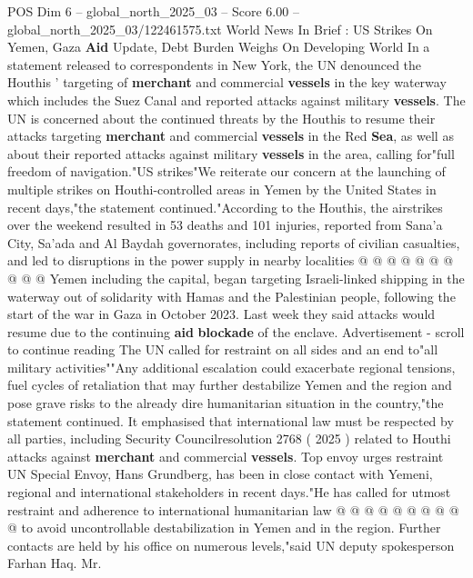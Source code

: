 \begin{textsample}{POS Dim 6 – global\_north\_2025\_03 – Score 6.00 – global\_north\_2025\_03/122461575.txt}  \label{ex:f6_pos_273}
World News In Brief : US Strikes On Yemen, Gaza \textbf{Aid} Update, Debt Burden Weighs On Developing World In a statement released to correspondents in New York, the UN denounced the Houthis ' targeting of \textbf{merchant} and commercial \textbf{vessels} in the key waterway which includes the Suez Canal and reported attacks against military \textbf{vessels}.
The UN is concerned about the continued threats by the Houthis to resume their attacks targeting \textbf{merchant} and commercial \textbf{vessels} in the Red \textbf{Sea}, as well as about their reported attacks against military \textbf{vessels} in the area, calling for"full freedom of navigation."US strikes"We reiterate our concern at the launching of multiple strikes on Houthi-controlled areas in Yemen by the United States in recent days,"the statement continued."According to the Houthis, the airstrikes over the weekend resulted in 53 deaths and 101 injuries, reported from Sana'a City, Sa'ada and Al Baydah governorates, including reports of civilian casualties, and led to disruptions in the power supply in nearby localities @ @ @ @ @ @ @ @ @ @ Yemen including the capital, began targeting Israeli-linked shipping in the waterway out of solidarity with Hamas and the Palestinian people, following the start of the war in Gaza in October 2023.
Last week they said attacks would resume due to the continuing \textbf{aid} \textbf{blockade} of the enclave.
Advertisement - scroll to continue reading The UN called for restraint on all sides and an end to"all military activities""Any additional escalation could exacerbate regional tensions, fuel cycles of retaliation that may further destabilize Yemen and the region and pose grave risks to the already dire humanitarian situation in the country,"the statement continued.
It emphasised that international law must be respected by all parties, including Security Councilresolution 2768 ( 2025 ) related to Houthi attacks against \textbf{merchant} and commercial \textbf{vessels}.
Top envoy urges restraint UN Special Envoy, Hans Grundberg, has been in close contact with Yemeni, regional and international stakeholders in recent days."He has called for utmost restraint and adherence to international humanitarian law @ @ @ @ @ @ @ @ @ @ to avoid uncontrollable destabilization in Yemen and in the region.
Further contacts are held by his office on numerous levels,"said UN deputy spokesperson Farhan Haq.
Mr.

\end{textsample}

